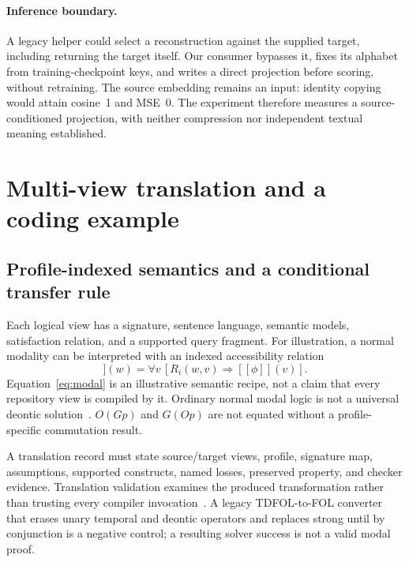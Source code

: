 \documentclass{article}
\begin{document}
\paragraph{Inference boundary.}
A legacy helper could select a reconstruction against the supplied target, including returning the target itself. Our consumer bypasses it, fixes its alphabet from training-checkpoint keys, and writes a direct projection before scoring, without retraining. The source embedding remains an input: identity copying would attain cosine~1 and MSE~0. The experiment therefore measures a source-conditioned projection, with neither compression nor independent textual meaning established.

\section{Multi-view translation and a coding example}
\subsection{Profile-indexed semantics and a conditional transfer rule}
Each logical view has a signature, sentence language, semantic models, satisfaction relation, and a supported query fragment. For illustration, a normal modality can be interpreted with an indexed accessibility relation
\begin{equation}
[\![\Box_i\phi]\!](w)=\forall v\,[R_i(w,v)\Rightarrow[\![\phi]\!](v)].
\label{eq:modal}
\end{equation}
Equation~\ref{eq:modal} is an illustrative semantic recipe, not a claim that every repository view is compiled by it. Ordinary normal modal logic is not a universal deontic solution~\citep{benzmuller2020logikey}. $O(Gp)$ and $G(Op)$ are not equated without a profile-specific commutation result.

A translation record must state source/target views, profile, signature map, assumptions, supported constructs, named losses, preserved property, and checker evidence. Translation validation examines the produced transformation rather than trusting every compiler invocation~\citep{pnueli1998translation}. A legacy TDFOL-to-FOL converter that erases unary temporal and deontic operators and replaces strong until by conjunction is a negative control; a resulting solver success is not a valid modal proof.
\end{document}
